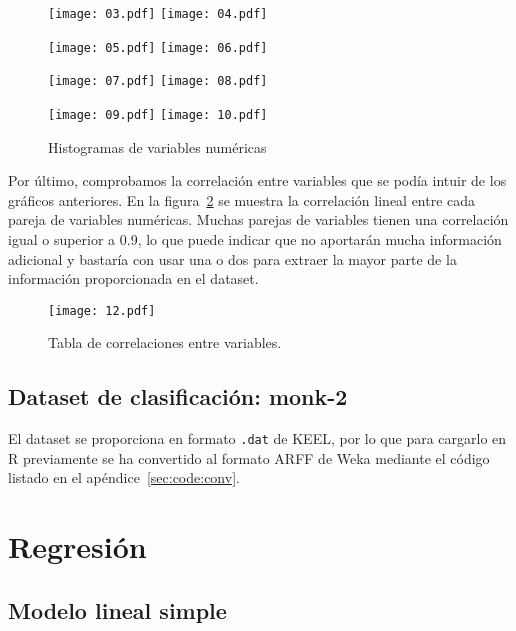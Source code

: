 \documentclass[a4paper, 11pt]{article}
\begin{document}
\begin{figure}
  \centering
  \texttt{[image: 03.pdf]}
  \hfill
  \texttt{[image: 04.pdf]}
  
  \texttt{[image: 05.pdf]}
  \hfill
  \texttt{[image: 06.pdf]}

  \texttt{[image: 07.pdf]}
  \hfill
  \texttt{[image: 08.pdf]}

  \texttt{[image: 09.pdf]}
  \hfill
  \texttt{[image: 10.pdf]}

  \caption{\label{fig:hist-num}Histogramas de variables numéricas}
  
\end{figure}

Por último, comprobamos la correlación entre variables que se podía intuir de los gráficos anteriores. En la figura~\ref{fig:abacorr} se muestra la correlación lineal entre cada pareja de variables numéricas. Muchas parejas de variables tienen una correlación igual o superior a 0.9, lo que puede indicar que no aportarán mucha información adicional y bastaría con usar una o dos para extraer la mayor parte de la información proporcionada en el dataset.

\begin{figure}
  \texttt{[image: 12.pdf]}
  \caption{\label{fig:abacorr}Tabla de correlaciones entre variables.}
  
\end{figure}

\subsection{Dataset de clasificación: monk-2}


El dataset se proporciona en formato \texttt{.dat} de KEEL, por lo que para cargarlo en R previamente se ha convertido al formato ARFF de Weka mediante el código listado en el apéndice~\ref{sec:code:conv}.

\section{Regresión}

\subsection{Modelo lineal simple}
\end{document}
